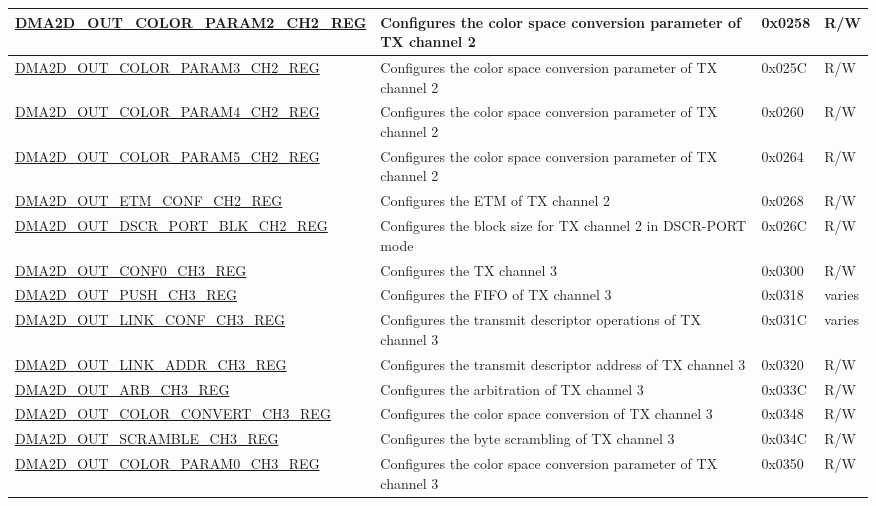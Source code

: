 \begin{longtable}{ | p{7cm} | p{11.5cm} | p{1.3cm} | p{2cm} | }
\hyperref[regdesc:DMA2DOUTCOLORPARAM2CHNREG]{DMA2D\_OUT\_COLOR\_PARAM2\_CH2\_REG} & Configures the color space conversion parameter of TX channel 2 & 0x0258 & R/W \\ \hline
\hyperref[regdesc:DMA2DOUTCOLORPARAM3CHNREG]{DMA2D\_OUT\_COLOR\_PARAM3\_CH2\_REG} & Configures the color space conversion parameter of TX channel 2 & 0x025C & R/W \\ \hline
\hyperref[regdesc:DMA2DOUTCOLORPARAM4CHNREG]{DMA2D\_OUT\_COLOR\_PARAM4\_CH2\_REG} & Configures the color space conversion parameter of TX channel 2 & 0x0260 & R/W \\ \hline
\hyperref[regdesc:DMA2DOUTCOLORPARAM5CHNREG]{DMA2D\_OUT\_COLOR\_PARAM5\_CH2\_REG} & Configures the color space conversion parameter of TX channel 2 & 0x0264 & R/W \\ \hline
\hyperref[regdesc:DMA2DOUTETMCONFCHNREG]{DMA2D\_OUT\_ETM\_CONF\_CH2\_REG} & Configures the ETM of TX channel 2 & 0x0268 & R/W \\ \hline
\hyperref[regdesc:DMA2DOUTDSCRPORTBLKCHNREG]{DMA2D\_OUT\_DSCR\_PORT\_BLK\_CH2\_REG} & Configures the block size for TX channel 2 in DSCR-PORT mode & 0x026C & R/W \\ \hline
\hyperref[regdesc:DMA2DOUTCONF0CHNREG]{DMA2D\_OUT\_CONF0\_CH3\_REG} & Configures the TX channel 3 & 0x0300 & R/W \\ \hline
\hyperref[regdesc:DMA2DOUTPUSHCHNREG]{DMA2D\_OUT\_PUSH\_CH3\_REG} & Configures the FIFO of TX channel 3 & 0x0318 & varies \\ \hline
\hyperref[regdesc:DMA2DOUTLINKCONFCHNREG]{DMA2D\_OUT\_LINK\_CONF\_CH3\_REG} & Configures the transmit descriptor operations of TX channel 3 & 0x031C & varies \\ \hline
\hyperref[regdesc:DMA2DOUTLINKADDRCHNREG]{DMA2D\_OUT\_LINK\_ADDR\_CH3\_REG} & Configures the transmit descriptor address of TX channel 3 & 0x0320 & R/W \\ \hline
\hyperref[regdesc:DMA2DOUTARBCHNREG]{DMA2D\_OUT\_ARB\_CH3\_REG} & Configures the arbitration of TX channel 3 & 0x033C & R/W \\ \hline
\hyperref[regdesc:DMA2DOUTCOLORCONVERTCHNREG]{DMA2D\_OUT\_COLOR\_CONVERT\_CH3\_REG} & Configures the color space conversion of TX channel 3 & 0x0348 & R/W \\ \hline
\hyperref[regdesc:DMA2DOUTSCRAMBLECHNREG]{DMA2D\_OUT\_SCRAMBLE\_CH3\_REG} & Configures the byte scrambling of TX channel 3 & 0x034C & R/W \\ \hline
\hyperref[regdesc:DMA2DOUTCOLORPARAM0CHNREG]{DMA2D\_OUT\_COLOR\_PARAM0\_CH3\_REG} & Configures the color space conversion parameter of TX channel 3 & 0x0350 & R/W \\ \hline

\end{longtable}
